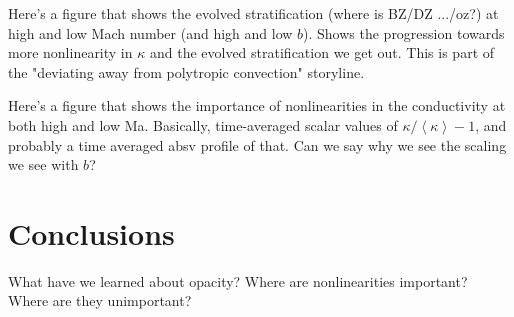 \documentclass[twocolumn, amsmath, amsfonts, amssymb]{aastex62}
\newcommand{\angles}[1]{\ensuremath{\left\langle #1 \right\rangle}}
\begin{document}
Here's a figure that shows the evolved stratification (where is BZ/DZ .../oz?) 
at high and low Mach number (and high and low $b$). Shows the progression towards
more nonlinearity in $\kappa$ and the evolved stratification we get out. This
is part of the "deviating away from polytropic convection" storyline.

Here's a figure that shows the importance of nonlinearities in
the conductivity at both high and low Ma. Basically, time-averaged scalar
values of $\kappa/\angles{\kappa} - 1$, and probably a time averaged
absv profile of that. Can we say why we see the scaling we see with $b$?


\section{Conclusions} \label{sec:conclusions}
What have we learned about opacity? Where are nonlinearities important?
Where are they unimportant?



\end{document}
